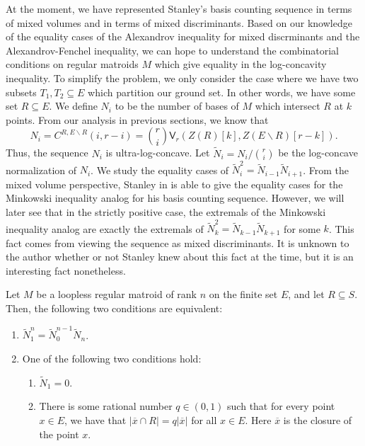 \documentclass{puthesis-UG}
\begin{document}
At the moment, we have represented Stanley's basis counting sequence in terms of mixed volumes and in terms of mixed discriminants. Based on our knowledge of the equality cases of the Alexandrov inequality for mixed discrminants and the Alexandrov-Fenchel inequality, we can hope to understand the combinatorial conditions on regular matroids $M$ which give equality in the log-concavity inequality. To simplify the problem, we only consider the case where we have two subsets $T_1, T_2 \subseteq E$ which partition our ground set. In other words, we have some set $R \subseteq E$. We define $N_i$ to be the number of bases of $M$ which intersect $R$ at $k$ points. From our analysis in previous sections, we know that 
\[
	N_i = C^{R, E \backslash R} (i, r-i) = \binom{r}{i} \mathsf{V}_r (Z(R)[k], Z(E \backslash R)[r-k]).
\] 
Thus, the sequence $N_i$ is ultra-log-concave. Let $\widetilde{N}_i = N_i / \binom{r}{i}$ be the log-concave normalization of $N_i$. We study the equality cases of $\widetilde{N}_i^2 = \widetilde{N}_{i-1} \widetilde{N}_{i+1}$. From the mixed volume perspective, Stanley in \cite{STANLEY} is able to give the equality cases for the Minkowski inequality analog for his basis counting sequence. However, we will later see that in the strictly positive case, the extremals of the Minkowski inequality analog are exactly the extremals of $\widetilde{N}_k^2 = \widetilde{N}_{k-1} \widetilde{N}_{k+1}$ for some $k$. This fact comes from viewing the sequence as mixed discriminants. It is unknown to the author whether or not Stanley knew about this fact at the time, but it is an interesting fact nonetheless.

\begin{thm}  \label{stanley-equality-cases-matroid-thm}
	Let $M$ be a loopless regular matroid of rank $n$ on the finite set $E$, and let $R \subseteq S$. Then, the following two conditions are equivalent:
	\begin{enumerate}[label = (\alph*)]
		\item $\widetilde{N}_1^n = \widetilde{N}_0^{n-1} \widetilde{N}_n$. 
		\item One of the following two conditions hold:
		\begin{enumerate}[label = (\roman*)]
			\item $\widetilde{N}_1 = 0$.
			\item There is some rational number $q \in (0, 1)$ such that for every point $x \in E$, we have that $|\overline{x} \cap R| = q |\overline{x}|$ for all $x \in E$. Here $\overline{x}$ is the closure of the point $x$.
		\end{enumerate}
	\end{enumerate}
\end{thm}
\end{document}
